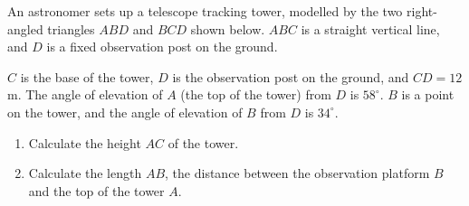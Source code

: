 \begin{question}
\noindent An astronomer sets up a telescope tracking tower, modelled by the two right-angled triangles $ABD$ and $BCD$ shown below. $ABC$ is a straight vertical line, and $D$ is a fixed observation post on the ground.

\begin{center}
\end{center}

\noindent $C$ is the base of the tower, $D$ is the observation post on the ground, and $CD = 12$ m.
The angle of elevation of $A$ (the top of the tower) from $D$ is $58^{\circ}$.
$B$ is a point on the tower, and the angle of elevation of $B$ from $D$ is $34^{\circ}$.

\begin{enumerate}
    \item[(a)] Calculate the height $AC$ of the tower.

    \vspace{4cm}

    \item[(b)] Calculate the length $AB$, the distance between the observation platform $B$ and the top of the tower $A$.

    \vspace{4cm}
\end{enumerate}
\end{question}
